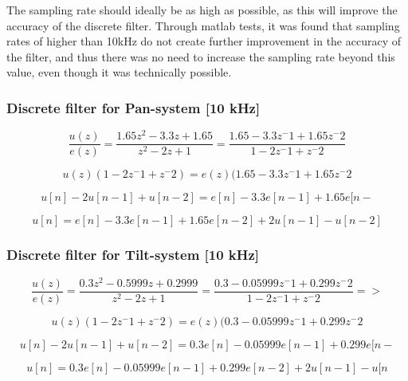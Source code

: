 The sampling rate should ideally be as high as possible, as this will improve the accuracy of the discrete filter. Through matlab tests, it was found that sampling rates of higher than 10kHz do not create further improvement in the accuracy of the filter, and thus there was no need to increase the sampling rate beyond this value, even though it was technically possible.

\subsubsection{Discrete filter for Pan-system [10 kHz]}

\begin{equation}
\frac{u(z)}{e(z)}=\frac{1.65z^2-3.3z+1.65}{z^2-2z+1}=\frac{1.65-3.3z^-1+1.65z^-2}{1-2
z^-1+z^-2}
\end{equation}

\begin{equation}
u(z)(1-2z^-1+z^-2)=e(z)(1.65-3.3z^-1+1.65z^-2
\end{equation}

\begin{equation}
u[n]-2u[n-1]+u[n-2]=e[n]-3.3e[n-1]+1.65e[n-
\end{equation}

\begin{equation}
u[n]=e[n]-3.3e[n-1]+1.65e[n-2]+2u[n-1]-u[n-2]
\end{equation}

\subsubsection{Discrete filter for Tilt-system [10 kHz]}

\begin{equation}
\frac{u(z)}{e(z)}=\frac{0.3z^2-0.5999z+0.2999}{z^2-2z+1}=\frac{0.3-0.05999z^-1+0.299z^-2}{1-2z^-1+z^-2} =>
\end{equation}

\begin{equation}
u(z)(1-2z^-1+z^-2)=e(z)(0.3-0.05999z^-1+0.299z^-2
\end{equation}

\begin{equation}
u[n]-2u[n-1]+u[n-2]=0.3e[n]-0.05999e[n-1]+0.299e[n-
\end{equation}

\begin{equation}
u[n]=0.3e[n]-0.05999e[n-1]+0.299e[n-2]+2u[n-1]-u[n
\end{equation}



